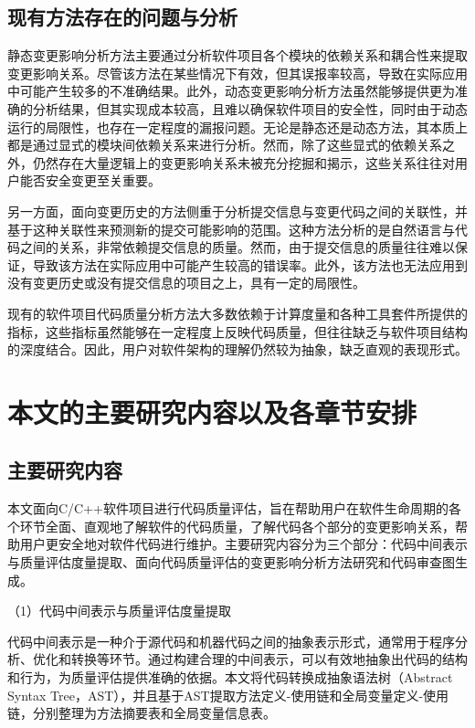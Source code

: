 \subsection{现有方法存在的问题与分析}

静态变更影响分析方法主要通过分析软件项目各个模块的依赖关系和耦合性来提取变更影响关系。尽管该方法在某些情况下有效，但其误报率较高，导致在实际应用中可能产生较多的不准确结果。此外，动态变更影响分析方法虽然能够提供更为准确的分析结果，但其实现成本较高，且难以确保软件项目的安全性，同时由于动态运行的局限性，也存在一定程度的漏报问题。无论是静态还是动态方法，其本质上都是通过显式的模块间依赖关系来进行分析。然而，除了这些显式的依赖关系之外，仍然存在大量逻辑上的变更影响关系未被充分挖掘和揭示，这些关系往往对用户能否安全变更至关重要。

另一方面，面向变更历史的方法侧重于分析提交信息与变更代码之间的关联性，并基于这种关联性来预测新的提交可能影响的范围。这种方法分析的是自然语言与代码之间的关系，非常依赖提交信息的质量。然而，由于提交信息的质量往往难以保证，导致该方法在实际应用中可能产生较高的错误率。此外，该方法也无法应用到没有变更历史或没有提交信息的项目之上，具有一定的局限性。

现有的软件项目代码质量分析方法大多数依赖于计算度量和各种工具套件所提供的指标，这些指标虽然能够在一定程度上反映代码质量，但往往缺乏与软件项目结构的深度结合。因此，用户对软件架构的理解仍然较为抽象，缺乏直观的表现形式。



\section{本文的主要研究内容以及各章节安排}
\subsection{主要研究内容}
本文面向C/C++软件项目进行代码质量评估，旨在帮助用户在软件生命周期的各个环节全面、直观地了解软件的代码质量，了解代码各个部分的变更影响关系，帮助用户更安全地对软件代码进行维护。主要研究内容分为三个部分：代码中间表示与质量评估度量提取、面向代码质量评估的变更影响分析方法研究和代码审查图生成。

（1）代码中间表示与质量评估度量提取

代码中间表示是一种介于源代码和机器代码之间的抽象表示形式，通常用于程序分析、优化和转换等环节。通过构建合理的中间表示，可以有效地抽象出代码的结构和行为，为质量评估提供准确的依据。本文将代码转换成抽象语法树（Abstract Syntax Tree，AST），并且基于AST提取方法定义-使用链和全局变量定义-使用链，分别整理为方法摘要表和全局变量信息表。

